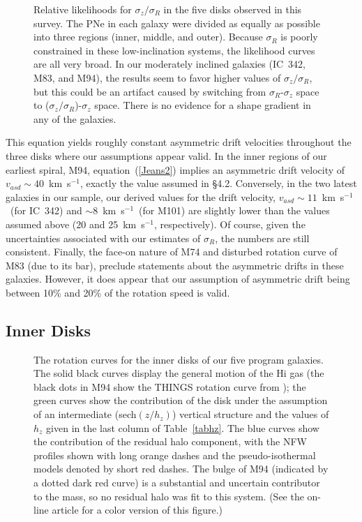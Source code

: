 \documentclass[12pt,preprint]{emulateapj}
\newcommand{\kms}{km~s$^{-1}$}
\begin{document}
\begin{figure}[t]
\caption{\scriptsize Relative likelihoods for $\sigma_z/\sigma_R$ in the five disks observed in this survey.  The PNe in each galaxy were divided as equally as possible into three regions (inner, middle, and outer).  Because $\sigma_R$ is poorly constrained in these low-inclination systems, the likelihood curves are all very broad.  In our moderately inclined galaxies (IC~342, M83, and M94), the results seem to favor higher values of $\sigma_z/\sigma_R$, but this could be an artifact caused by switching from $\sigma_R$-$\sigma_z$ space to ($\sigma_z/\sigma_R$)-$\sigma_z$ space.  There is no evidence for a shape gradient in any of the galaxies. \label{shapes} }
\end{figure}

This equation yields roughly constant asymmetric drift velocities throughout the three disks where our assumptions appear valid.  In the inner regions of our earliest spiral, M94, equation~(\ref{Jeans2}) implies an asymmetric drift velocity of $v_{asd} \sim 40$~\kms,  exactly the value assumed in \S 4.2.  Conversely, in the two latest galaxies in our sample, our derived values for the drift velocity, $v_{asd} \sim 11$~\kms\ (for IC~342) and $\sim$8~\kms\ (for M101) are slightly lower than the values assumed above (20 and 25~\kms, respectively).  Of course, given the uncertainties associated with our estimates of $\sigma_R$, the numbers are still consistent.  Finally, the face-on nature of M74 and disturbed rotation curve of M83 (due to its bar), preclude statements about the asymmetric drifts in these galaxies.  However, it does appear that our assumption of asymmetric drift being between 10\% and 20\% of the rotation speed is valid.

\subsection{Inner Disks}

\begin{figure}
\caption{\scriptsize The rotation curves for the inner disks of our five program galaxies. The solid black curves display the general motion of the H{\sc i} gas (the black dots in M94 show the THINGS rotation curve from \citet{dB+08}); the green curves show the contribution of the disk under the assumption of an intermediate (sech$(z / h_z)$) vertical structure and the values of $h_z$ given in the last column of Table~\ref{tabhz}.  The blue curves show the contribution of the residual halo component, with the NFW profiles shown with long orange dashes and the pseudo-isothermal models denoted by short red dashes.  The bulge of M94 (indicated by a dotted dark red curve) is a substantial and uncertain contributor to the mass, so no residual halo was fit to this system.  (See the on-line article for a color version of this figure.) \label{rotcurves} }
\end{figure}
\end{document}
